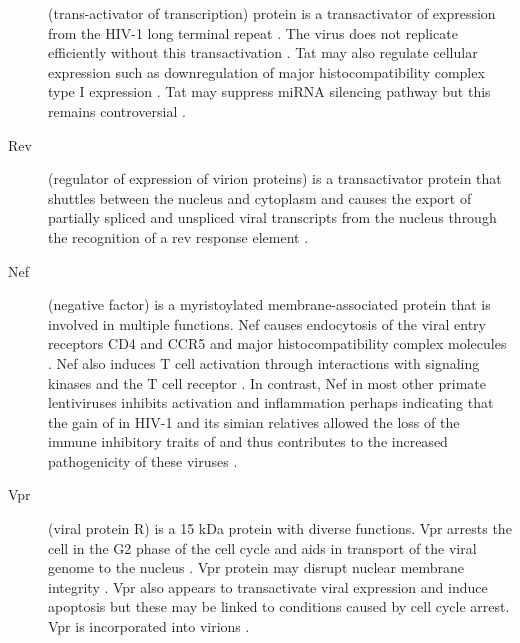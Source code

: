 \documentclass[../sherrill-Mix_thesis.tex]{subfiles}
\begin{document}
\begin{description}
			 (trans-activator of transcription) protein is a transactivator of expression from the HIV-1 long terminal repeat \citep{Sodroski1985,Sodroski1985a,Cullen1986}. The virus does not replicate efficiently without this transactivation \citep{Dayton1986}. Tat may also regulate cellular expression such as downregulation of major histocompatibility complex type I expression \citep{Howcroft1993}.  Tat may suppress miRNA silencing pathway \citep{Bennasser2005,Triboulet2007,Qian2009} but this remains controversial \citep{Lin2007}.
		\item[Rev]
			(regulator of expression of virion proteins) is a transactivator protein that shuttles between the nucleus and cytoplasm \citep{Meyer1994} and causes the export of partially spliced and unspliced viral transcripts \citep{Sodroski1986,Feinberg1986,Knight1987,Malim1988,Gutman1988} from the nucleus through the recognition of a rev response element \citep{Malim1989,Malim1989a}.
		\item[Nef]
				(negative factor) is a myristoylated membrane-associated protein \citep{Yu1992} that is involved in multiple functions. Nef causes endocytosis of the viral entry receptors CD4 \citep{Garcia1991,Benson1993,Aiken1994,Lama1999,Ross1999} and CCR5 \citep{Michel2005} and major histocompatibility complex molecules \citep{Schwartz1996,Collins1998,Stumptner-Cuvelette2001,Blagoveshchenskaya2002}. Nef also induces T cell activation through interactions with signaling kinases and the T cell receptor \citep{Xu1999,Schrager1999,Wang2000,Simmons2001,Schrager2002}. In contrast, Nef in most other primate lentiviruses inhibits activation and inflammation \citep{Schindler2006} perhaps indicating that the gain of \vpu{} in HIV-1 and its simian relatives allowed the loss of the immune inhibitory traits of \nef{} and thus contributes to the increased pathogenicity of these viruses \citep{Kirchhoff2008,Kirchhoff2009}.
		\item[Vpr]
			(viral protein R) is a 15 kDa protein \citep{Wong-Staal1987,Cohen1990} with diverse functions. Vpr arrests the cell in the G2 phase of the cell cycle \citep{Jowett1995,Re1995,He1995,Rogel1995,Noronha2001} and aids in transport of the viral genome to the nucleus \citep{Heinzinger1994}. Vpr protein may disrupt nuclear membrane integrity \citep{Noronha2001}. Vpr also appears to transactivate viral expression \citep{Goh1998,Subbramanian1998} and induce apoptosis \citep{Stewart1997,Shostak1999} but these may be linked to conditions caused by cell cycle arrest.  Vpr is incorporated into virions \citep{Cohen1990a,Yuan1990}.

\end{description}
\end{document}
